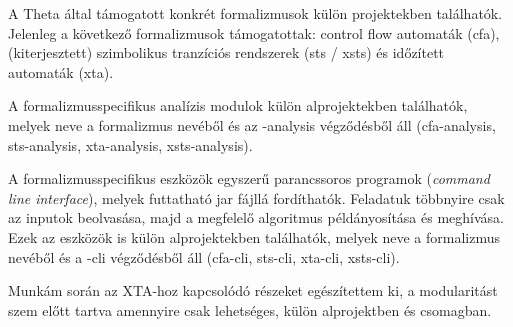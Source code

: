 A Theta által támogatott konkrét formalizmusok külön projektekben találhatók. Jelenleg a következő formalizmusok támogatottak: control flow automaták (\textsf{cfa}), (kiterjesztett) szimbolikus tranzíciós rendszerek (\textsf{sts} / \textsf{xsts}) és időzített automaták (\textsf{xta}).

A formalizmusspecifikus analízis modulok külön alprojektekben találhatók, melyek neve a formalizmus nevéből és az \textsf{-analysis} végződésből áll (\textsf{cfa-analysis}, \textsf{sts-analysis}, \textsf{xta-analysis}, \textsf{xsts-analysis}).

A formalizmusspecifikus eszközök egyszerű parancssoros programok (\emph{command line interface}), melyek futtatható jar fájllá fordíthatók. Feladatuk többnyire csak az inputok beolvasása, majd a megfelelő algoritmus példányosítása és meghívása. Ezek az eszközök is külön alprojektekben találhatók, melyek neve a formalizmus nevéből és a \textsf{-cli} végződésből áll (\textsf{cfa-cli}, \textsf{sts-cli}, \textsf{xta-cli}, \textsf{xsts-cli}).

Munkám során az XTA-hoz kapcsolódó részeket egészítettem ki, a modularitást szem előtt tartva amennyire csak lehetséges, külön alprojektben és csomagban.